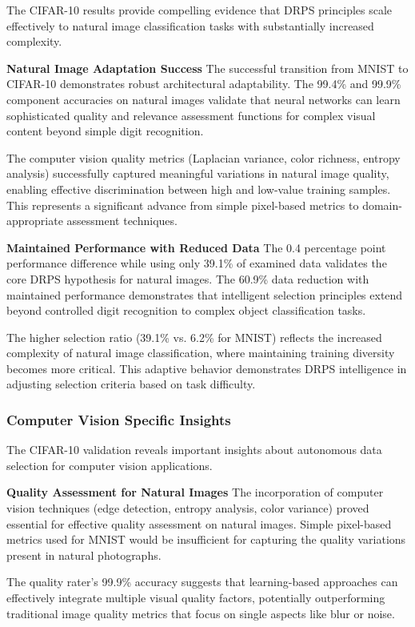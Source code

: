 \documentclass[12pt]{article}
\begin{document}
The CIFAR-10 results provide compelling evidence that DRPS principles scale effectively to natural image classification tasks with substantially increased complexity.

\textbf{Natural Image Adaptation Success}
The successful transition from MNIST to CIFAR-10 demonstrates robust architectural adaptability. The 99.4\% and 99.9\% component accuracies on natural images validate that neural networks can learn sophisticated quality and relevance assessment functions for complex visual content beyond simple digit recognition.

The computer vision quality metrics (Laplacian variance, color richness, entropy analysis) successfully captured meaningful variations in natural image quality, enabling effective discrimination between high and low-value training samples. This represents a significant advance from simple pixel-based metrics to domain-appropriate assessment techniques.

\textbf{Maintained Performance with Reduced Data}
The 0.4 percentage point performance difference while using only 39.1\% of examined data validates the core DRPS hypothesis for natural images. The 60.9\% data reduction with maintained performance demonstrates that intelligent selection principles extend beyond controlled digit recognition to complex object classification tasks.

The higher selection ratio (39.1\% vs. 6.2\% for MNIST) reflects the increased complexity of natural image classification, where maintaining training diversity becomes more critical. This adaptive behavior demonstrates DRPS intelligence in adjusting selection criteria based on task difficulty.

\subsubsection{Computer Vision Specific Insights}\label{cv-insights}

The CIFAR-10 validation reveals important insights about autonomous data selection for computer vision applications.

\textbf{Quality Assessment for Natural Images}
The incorporation of computer vision techniques (edge detection, entropy analysis, color variance) proved essential for effective quality assessment on natural images. Simple pixel-based metrics used for MNIST would be insufficient for capturing the quality variations present in natural photographs.

The quality rater's 99.9\% accuracy suggests that learning-based approaches can effectively integrate multiple visual quality factors, potentially outperforming traditional image quality metrics that focus on single aspects like blur or noise.
\end{document}
